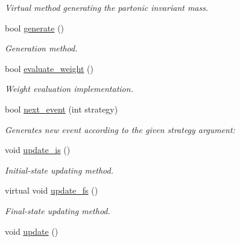 \begin{DoxyCompactItemize}
\begin{DoxyCompactList}\small\item\em Virtual method generating the partonic invariant mass. \end{DoxyCompactList}\item 
\hypertarget{a00441_a52fbb6eff4d9904e7204de45abd6ef4b}{bool \hyperlink{a00441_a52fbb6eff4d9904e7204de45abd6ef4b}{generate} ()}\label{a00441_a52fbb6eff4d9904e7204de45abd6ef4b}

\begin{DoxyCompactList}\small\item\em Generation method. \end{DoxyCompactList}\item 
\hypertarget{a00441_a8ce23c37ec3b10dee89993b684c79171}{bool \hyperlink{a00441_a8ce23c37ec3b10dee89993b684c79171}{evaluate\-\_\-weight} ()}\label{a00441_a8ce23c37ec3b10dee89993b684c79171}

\begin{DoxyCompactList}\small\item\em Weight evaluation implementation. \end{DoxyCompactList}\item 
\hypertarget{a00441_a4f6c2d0ebb8881183176df28e205a64f}{bool \hyperlink{a00441_a4f6c2d0ebb8881183176df28e205a64f}{next\-\_\-event} (int strategy)}\label{a00441_a4f6c2d0ebb8881183176df28e205a64f}

\begin{DoxyCompactList}\small\item\em Generates new event according to the given strategy argument\-: \end{DoxyCompactList}\item 
\hypertarget{a00441_af7625891b439b704b61ca31b7899edc1}{void \hyperlink{a00441_af7625891b439b704b61ca31b7899edc1}{update\-\_\-is} ()}\label{a00441_af7625891b439b704b61ca31b7899edc1}

\begin{DoxyCompactList}\small\item\em Initial-\/state updating method. \end{DoxyCompactList}\item 
\hypertarget{a00441_a4229a4f7f9de598e94e2199fedd453cd}{virtual void \hyperlink{a00441_a4229a4f7f9de598e94e2199fedd453cd}{update\-\_\-fs} ()}\label{a00441_a4229a4f7f9de598e94e2199fedd453cd}

\begin{DoxyCompactList}\small\item\em Final-\/state updating method. \end{DoxyCompactList}\item 
\hypertarget{a00441_ad39ca1d2f77f59ca2283b2b6d2c10080}{void \hyperlink{a00441_ad39ca1d2f77f59ca2283b2b6d2c10080}{update} ()}\label{a00441_ad39ca1d2f77f59ca2283b2b6d2c10080}


\end{DoxyCompactItemize}
